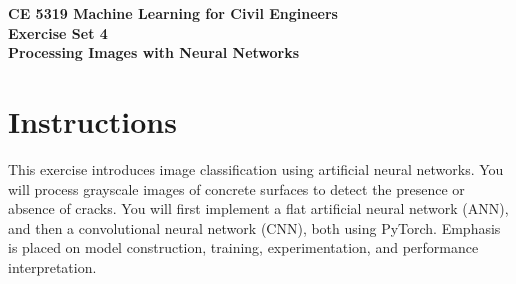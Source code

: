 \documentclass[12pt]{article}
\begin{document}
\begin{center}
{\textbf{{ CE 5319 Machine Learning for Civil Engineers} \\ {Exercise Set 4} \\ {Processing Images with Neural Networks}}}
\end{center}

\section*{Instructions}
This exercise introduces image classification using artificial neural networks. You will process grayscale images of concrete surfaces to detect the presence or absence of cracks. You will first implement a flat artificial neural network (ANN), and then a convolutional neural network (CNN), both using PyTorch. Emphasis is placed on model construction, training, experimentation, and performance interpretation.
\end{document}
